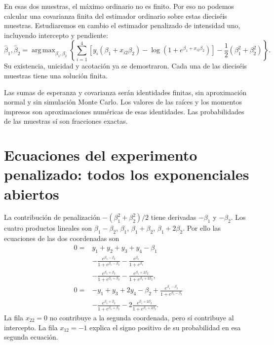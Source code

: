 \documentclass[11pt,a4paper]{article}
\DeclareMathOperator*{\argmax}{arg\,max}
\begin{document}
En esas dos muestras, el máximo ordinario no es finito.
Por eso no podemos calcular una covarianza finita
del estimador ordinario sobre estas dieciséis muestras.
Estudiaremos en cambio el estimador penalizado de
intensidad uno, incluyendo intercepto y pendiente:
\[
\widehat\beta_1,\widehat\beta_2
=\argmax_{\beta_1,\beta_2}
\left\{\sum_{i=1}^4
[y_i(\beta_1+x_{i2}\beta_2)-\log(1+e^{\beta_1+x_{i2}\beta_2})]
-\frac12(\beta_1^2+\beta_2^2)\right\}.
\]
Su existencia, unicidad y acotación ya se demostraron.
Cada una de las dieciséis muestras tiene una solución finita.

Las sumas de esperanza y covarianza serán identidades finitas,
sin aproximación normal y sin simulación Monte Carlo.
Los valores de las raíces y los momentos impresos son
aproximaciones numéricas de esas identidades.
Las probabilidades de las muestras sí son fracciones exactas.

\clearpage
\section{Ecuaciones del experimento penalizado: todos los exponenciales abiertos}\label{logit124}
La contribución de penalización \(-(\beta_1^2+\beta_2^2)/2\)
tiene derivadas \(-\beta_1\) y \(-\beta_2\).
Los cuatro productos lineales son
\(\beta_1-\beta_2\), \(\beta_1\),
\(\beta_1+\beta_2\), \(\beta_1+2\beta_2\).
Por ello las ecuaciones de las dos coordenadas son
\[
\begin{aligned}
0={}&y_1+y_2+y_3+y_4-\beta_1\\
&-\frac{e^{\beta_1-\beta_2}}{1+e^{\beta_1-\beta_2}}
-\frac{e^{\beta_1}}{1+e^{\beta_1}}\\
&-\frac{e^{\beta_1+\beta_2}}{1+e^{\beta_1+\beta_2}}
-\frac{e^{\beta_1+2\beta_2}}{1+e^{\beta_1+2\beta_2}},\\[3pt]
0={}&-y_1+y_3+2y_4-\beta_2
+\frac{e^{\beta_1-\beta_2}}{1+e^{\beta_1-\beta_2}}\\
&-\frac{e^{\beta_1+\beta_2}}{1+e^{\beta_1+\beta_2}}
-2\frac{e^{\beta_1+2\beta_2}}{1+e^{\beta_1+2\beta_2}}.
\end{aligned}
\]
La fila \(x_{22}=0\) no contribuye a la segunda coordenada,
pero sí contribuye al intercepto.
La fila \(x_{12}=-1\) explica el signo positivo de su
probabilidad en esa segunda ecuación.
\end{document}
